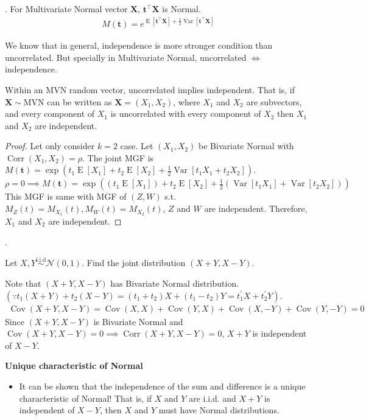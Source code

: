 \documentclass[8pt]{beamer}
\newcommand{\mb}[1]{\mathbf{#1}}
\newcommand{\mc}[1]{\mathcal{#1}}
\newcommand{\tb}[1]{\textbf{#1}}
\newcommand{\expec}[1]{\operatorname{E}\left[ #1 \right]}
\newcommand{\Var}[1]{\operatorname{Var}\left[#1\right]}
\newcommand{\Cov}[2]{\operatorname{Cov}\!\left(#1, #2\right)}
\newcommand{\Corr}[2]{\operatorname{Corr}\!\left(#1, #2\right)}
\begin{document}
\begin{frame}{.}
    For Multivariate Normal vector $\mb{X}$, $\mb{t}^\top \mb{X}$ is Normal.
    \[
    \begin{aligned}
        M(\mb{t}) = e^{\expec{\mb{t}^\top \mb{X}}+ \frac{1}{2}\Var{\mb{t}^\top \mb{X}}}
    \end{aligned}
    \]

    \bigskip
    We know that in general, independence is more stronger condition than uncorrelated.
    But specially in Multivariate Normal, uncorrelated $\iff$ independence.

    \begin{theorem}
        Within an MVN random vector, uncorrelated implies independent. That is, if $\mb{X} \sim \text{MVN}$ can be written as $\mb{X} = (X_1, X_2)$, where $X_1$ and $X_2$ are subvectors, and every component of $X_1$ is uncorrelated with every component of $X_2$ then $X_1$ and $X_2$ are independent.
    \end{theorem}

    \begin{proof}
        Let only consider $k=2$ case. Let $(X_1,X_2)$ be Bivariate Normal with $\Corr{X_1}{X_2} = \rho$. The joint MGF is $M(\mb{t}) = \exp{(t_1 \expec{X_1} + t_2 \expec{X_2} + \frac{1}{2}\Var{t_1 X_1 + t_2 X_2})}$. $\rho = 0 \implies M(\mb{t}) = \exp{\left((t_1 \expec{X_1}) + t_2 \expec{X_2} + \frac{1}{2}(\Var{t_1 X_1}+ \Var{t_2 X_2})\right)}$
        This MGF is same with MGF of $(Z, W)$ s.t. $M_Z(t) = M_{X_1}(t), M_W(t) = M_{X_2}(t)$, $Z$ and $W$ are independent. Therefore, $X_1$ and $X_2$ are independent.
    \end{proof}
\end{frame}

\begin{frame}{.}
    \begin{example}
        Let $X,Y \overset{\text{i.i.d}}{\sim} \mc{N}(0, 1)$. Find the joint distribution $(X+Y, X-Y)$.
    \end{example}
    Note that $(X+Y, X-Y)$ has Bivariate Normal distribution. $(\because t_1(X+Y) + t_2 (X -Y) = (t_1 + t_2)X + (t_1 - t_2)Y = t^\prime_1 X + t^\prime_2 Y)$.
    \[
    \begin{aligned}
        \Cov{X+Y}{X-Y} = \Cov{X}{X} + \Cov{Y}{X} + \Cov{X}{-Y} + \Cov{Y}{-Y} = 0
    \end{aligned}
    \]
    Since $(X+Y, X-Y)$ is Bivariate Normal and $\Cov{X+Y}{X-Y} = 0 \implies \Corr{X+Y}{X-Y} = 0$, $X+Y$ is independent of $X-Y$.

    \bigskip
    \tb{Unique characteristic of Normal}
    \begin{itemize}
        \item It can be shown that the independence of the sum and difference is a unique characteristic of Normal! That is, if $X$ and $Y$ are i.i.d. and $X+Y$ is independent of $X-Y$, then $X$ and $Y$ must have Normal distributions.
    \end{itemize}
\end{frame}
\end{document}
